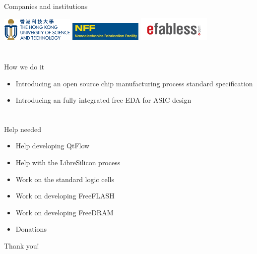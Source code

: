 \documentclass[9pt]{beamer}
\begin{document}
\begin{frame}{Companies and institutions}
	\begin{center}
		\includegraphics[width=100pt]{HKUST_Logo.png}
		\includegraphics[width=100pt]{NFF.jpg}
		\includegraphics[width=100pt]{efabless_logo.png}
	\end{center}
\end{frame}

\section[How]{}
\begin{frame}{How we do it}
	\begin{itemize}
		\item Introducing an open source chip manufacturing process standard specification
		\item Introducing an fully integrated free EDA for ASIC design\footnotemark
	\end{itemize}

\end{frame}

\section[Conclusion]{}

\begin{frame}{Help needed}
	\begin{itemize}
		\item Help developing QtFlow\footnotemark
		\item Help with the LibreSilicon process\footnotemark
		\item Work on the standard logic cells
		\item Work on developing FreeFLASH
		\item Work on developing FreeDRAM
		\item Donations
	\end{itemize}

\end{frame}

\begin{frame}{Thank you!}
\end{frame}
\end{document}
